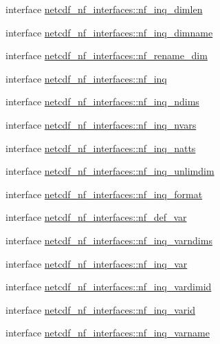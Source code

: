 \begin{DoxyCompactItemize}
\item 
interface \hyperlink{interfacenetcdf__nf__interfaces_1_1nf__inq__dimlen}{netcdf\+\_\+nf\+\_\+interfaces\+::nf\+\_\+inq\+\_\+dimlen}
\item 
interface \hyperlink{interfacenetcdf__nf__interfaces_1_1nf__inq__dimname}{netcdf\+\_\+nf\+\_\+interfaces\+::nf\+\_\+inq\+\_\+dimname}
\item 
interface \hyperlink{interfacenetcdf__nf__interfaces_1_1nf__rename__dim}{netcdf\+\_\+nf\+\_\+interfaces\+::nf\+\_\+rename\+\_\+dim}
\item 
interface \hyperlink{interfacenetcdf__nf__interfaces_1_1nf__inq}{netcdf\+\_\+nf\+\_\+interfaces\+::nf\+\_\+inq}
\item 
interface \hyperlink{interfacenetcdf__nf__interfaces_1_1nf__inq__ndims}{netcdf\+\_\+nf\+\_\+interfaces\+::nf\+\_\+inq\+\_\+ndims}
\item 
interface \hyperlink{interfacenetcdf__nf__interfaces_1_1nf__inq__nvars}{netcdf\+\_\+nf\+\_\+interfaces\+::nf\+\_\+inq\+\_\+nvars}
\item 
interface \hyperlink{interfacenetcdf__nf__interfaces_1_1nf__inq__natts}{netcdf\+\_\+nf\+\_\+interfaces\+::nf\+\_\+inq\+\_\+natts}
\item 
interface \hyperlink{interfacenetcdf__nf__interfaces_1_1nf__inq__unlimdim}{netcdf\+\_\+nf\+\_\+interfaces\+::nf\+\_\+inq\+\_\+unlimdim}
\item 
interface \hyperlink{interfacenetcdf__nf__interfaces_1_1nf__inq__format}{netcdf\+\_\+nf\+\_\+interfaces\+::nf\+\_\+inq\+\_\+format}
\item 
interface \hyperlink{interfacenetcdf__nf__interfaces_1_1nf__def__var}{netcdf\+\_\+nf\+\_\+interfaces\+::nf\+\_\+def\+\_\+var}
\item 
interface \hyperlink{interfacenetcdf__nf__interfaces_1_1nf__inq__varndims}{netcdf\+\_\+nf\+\_\+interfaces\+::nf\+\_\+inq\+\_\+varndims}
\item 
interface \hyperlink{interfacenetcdf__nf__interfaces_1_1nf__inq__var}{netcdf\+\_\+nf\+\_\+interfaces\+::nf\+\_\+inq\+\_\+var}
\item 
interface \hyperlink{interfacenetcdf__nf__interfaces_1_1nf__inq__vardimid}{netcdf\+\_\+nf\+\_\+interfaces\+::nf\+\_\+inq\+\_\+vardimid}
\item 
interface \hyperlink{interfacenetcdf__nf__interfaces_1_1nf__inq__varid}{netcdf\+\_\+nf\+\_\+interfaces\+::nf\+\_\+inq\+\_\+varid}
\item 
interface \hyperlink{interfacenetcdf__nf__interfaces_1_1nf__inq__varname}{netcdf\+\_\+nf\+\_\+interfaces\+::nf\+\_\+inq\+\_\+varname}

\end{DoxyCompactItemize}
